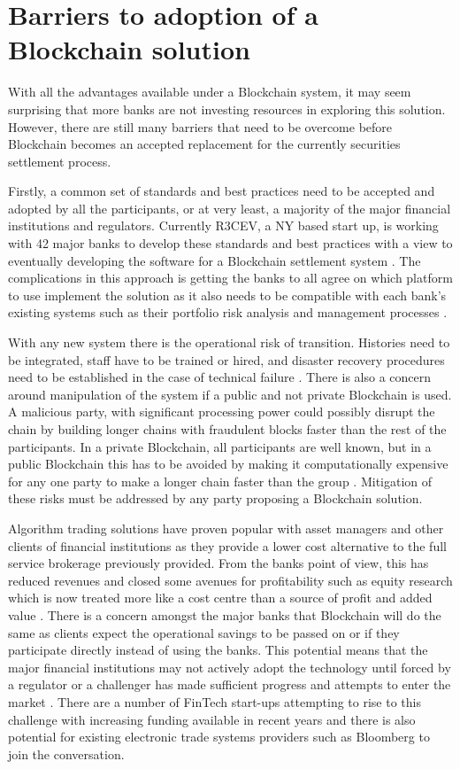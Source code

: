 \documentclass{article}
\begin{document}
\section{Barriers to adoption of a Blockchain solution}

With all the advantages available under a Blockchain system, it may seem surprising that more banks are not investing resources in exploring this solution. However, there are still many barriers that need to be overcome before Blockchain becomes an accepted replacement for the currently securities settlement process.

Firstly, a common set of standards and best practices need to be accepted and adopted by all the participants, or at very least, a majority of the major financial institutions and regulators. Currently R3CEV, a NY based start up, is working with 42 major banks to develop these standards and best practices with a view to eventually developing the software for a Blockchain settlement system \cite{Deloitte}. The complications in this approach is getting the banks to all agree on which platform to use implement the solution as it also needs to be compatible with each bank's existing systems such as their portfolio risk analysis and management processes \cite{WymanEuro}.

With any new system there is the operational risk of transition. Histories need to be integrated, staff have to be trained or hired, and disaster recovery procedures need to be established in the case of technical failure \cite{Accenture}. There is also a concern around manipulation of the system if a public and not private Blockchain is used. A malicious party, with significant processing power could possibly disrupt the chain by building longer chains with fraudulent blocks faster than the rest of the participants. In a private Blockchain, all participants are well known, but in a public Blockchain this has to be avoided by making it computationally expensive for any one party to make a longer chain faster than the group \cite{gentleIntro}. Mitigation of these risks must be addressed by any party proposing a Blockchain solution.

Algorithm trading solutions have proven popular with asset managers and other clients of financial institutions as they provide a lower cost alternative to the full service brokerage previously provided. From the banks point of view, this has reduced revenues and closed some avenues for profitability such as equity research which is now treated more like a cost centre than a source of profit and added value \cite{FT}. There is a concern amongst the major banks that Blockchain will do the same as clients expect the operational savings to be passed on or if they participate directly instead of using the banks. This potential means that the major financial institutions may not actively adopt the technology until forced by a regulator or a challenger has made sufficient progress and attempts to enter the market \cite{WymanEuro}. There are a number of FinTech start-ups attempting to rise to this challenge with increasing funding available in recent years \cite{Accenture} and there is also potential for existing electronic trade systems providers such as Bloomberg to join the conversation.
\end{document}
